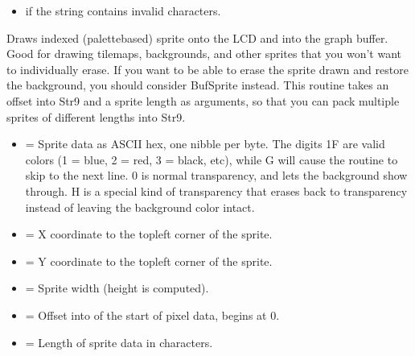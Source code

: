 \documentclass[letterpaper,10pt,english]{sphinxmanual}
\begin{document}
\begin{description}
\begin{description}
\begin{itemize}
\item {} 
\sphinxAtStartPar
{} if the string contains invalid characters.

\end{itemize}

\end{description}

\sphinxAtStartPar
Draws indexed (palette\sphinxhyphen{}based) sprite onto the LCD and into the graph buffer. Good for drawing tilemaps, backgrounds, and other sprites that you won’t want to individually erase. If you want to be able to erase the sprite drawn and restore the background, you should consider BufSprite instead. This routine takes an offset into Str9 and a sprite length as arguments, so that you can pack multiple sprites of different lengths into Str9.
\begin{description}
\begin{itemize}
\item {} 
\sphinxAtStartPar
{} = Sprite data as ASCII hex, one nibble per byte. The digits 1\sphinxhyphen{}F are valid colors (1 = blue, 2 = red, 3 = black, etc), while G will cause the routine to skip to the next line. 0 is normal transparency, and lets the background show through. H is a special kind of transparency that erases back to transparency instead of leaving the background color intact.

\item {} 
\sphinxAtStartPar
{} = X coordinate to the top\sphinxhyphen{}left corner of the sprite.

\item {} 
\sphinxAtStartPar
{} = Y coordinate to the top\sphinxhyphen{}left corner of the sprite.

\item {} 
\sphinxAtStartPar
{} = Sprite width (height is computed).

\item {} 
\sphinxAtStartPar
{} = Offset into  of the start of pixel data, begins at 0.

\item {} 
\sphinxAtStartPar
{} = Length of sprite data in characters.


\end{itemize}
\end{description}
\end{description}
\end{document}
